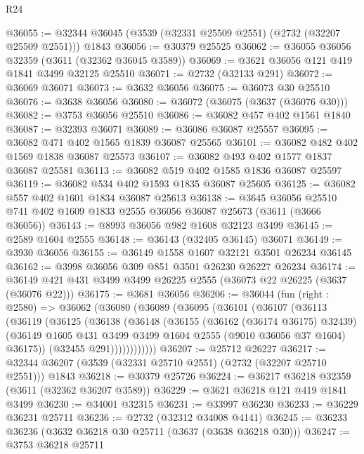 \begin{lexlean}{R24}
\begin{coremodule}
@36055 := @32344 @36045 (@3539 (@32331 @25509 @2551) (@2732 (@32207 @25509 @2551))) @1843
@36056 := @30379 @25525
@36062 := @36055 @36056 @32359 (@3611 (@32362 @36045 @3589))
@36069 := @3621 @36056 @121 @419 @1841 @3499 @32125 @25510
@36071 := @2732 (@32133 @291)
@36072 := @36069 @36071
@36073 := @3632 @36056
@36075 := @36073 @30 @25510
@36076 := @3638 @36056
@36080 := @36072 (@36075 (@3637 (@36076 @30)))
@36082 := @3753 @36056 @25510
@36086 := @36082 @457 @402 @1561 @1840
@36087 := @32393 @36071
@36089 := @36086 @36087 @25557
@36095 := @36082 @471 @402 @1565 @1839 @36087 @25565
@36101 := @36082 @482 @402 @1569 @1838 @36087 @25573
@36107 := @36082 @493 @402 @1577 @1837 @36087 @25581
@36113 := @36082 @519 @402 @1585 @1836 @36087 @25597
@36119 := @36082 @534 @402 @1593 @1835 @36087 @25605
@36125 := @36082 @557 @402 @1601 @1834 @36087 @25613
@36138 := @3645
    @36056
    @25510
    @741
    @402
    @1609
    @1833
    @2555
    @36056
    @36087
    @25673
    (@3611 (@3666 @36056))
@36143 := @8993 @36056 @982 @1608 @32123 @3499
@36145 := @2589 @1604 @2555
@36148 := @36143 (@32405 @36145) @36071
@36149 := @3930 @36056
@36155 := @36149 @1558 @1607 @32121 @3501 @26234 @36145
@36162 := @3998 @36056 @309 @851 @3501 @26230 @26227 @26234
@36174 := @36149 @421 @431 @3499 @3499 @26225 @2555 (@36073 @22 @26225 (@3637 (@36076 @22)))
@36175 := @3681 @36056
@36206 := @36044
    (fun (right : @2580) =>
    @36062
      (@36080
        (@36089
          (@36095
            (@36101
              (@36107
                (@36113
                  (@36119
                    (@36125
                      (@36138
                        (@36148
                          (@36155
                            (@36162 (@36174 @36175) @32439)
                            (@36149
                              @1605
                              @431
                              @3499
                              @3499
                              @1604
                              @2555
                              (@9010 @36056 @37 @1604)
                              @36175))
                          (@32455 @291))))))))))))
@36207 := @25712 @26227
@36217 := @32344 @36207 (@3539 (@32331 @25710 @2551) (@2732 (@32207 @25710 @2551))) @1843
@36218 := @30379 @25726
@36224 := @36217 @36218 @32359 (@3611 (@32362 @36207 @3589))
@36229 := @3621 @36218 @121 @419 @1841 @3499
@36230 := @34001 @32315
@36231 := @33997 @36230
@36233 := @36229 @36231 @25711
@36236 := @2732 (@32312 @34008 @4141)
@36245 := @36233 @36236 (@3632 @36218 @30 @25711 (@3637 (@3638 @36218 @30)))
@36247 := @3753 @36218 @25711

\end{coremodule}
\end{lexlean}
